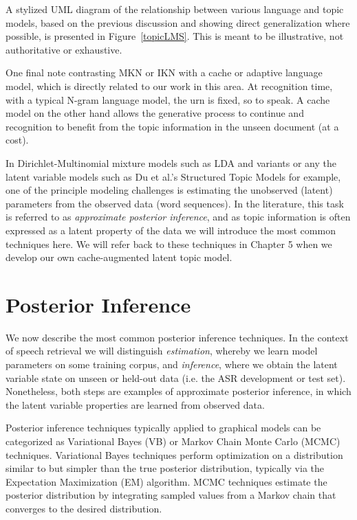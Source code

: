 % 

A stylized UML diagram of the relationship between various language and topic models, based on the previous discussion and showing direct generalization where possible, is presented in Figure~\ref{topicLMS}.  This is meant to be illustrative, not authoritative or exhaustive.

One final note contrasting MKN or IKN with a cache or adaptive language model, which is directly related to our work in this area.   At recognition time, with a typical N-gram language model, the urn is fixed, so to speak.  A cache model on the other hand allows the generative process to continue and recognition to benefit from the topic information in the unseen document (at a cost).  

In Dirichlet-Multinomial mixture models such as LDA and variants or any the latent variable models such as Du et al.'s Structured Topic Models for example, one of the principle modeling challenges is estimating the unobserved (latent) parameters from the observed data (word sequences).  In the literature, this task is referred to as \textit{approximate posterior inference}, and as topic information is often expressed as a latent property of the data we will introduce the most common techniques here.  We will refer back to these techniques in Chapter 5 when we develop our own cache-augmented latent topic model.

\section{Posterior Inference}
\label{sec:postInf}
We now describe the most common posterior inference techniques.  In the context of speech retrieval we will distinguish \textit{estimation}, whereby we learn model parameters on some training corpus, and \textit{inference}, where we obtain the latent variable state on unseen or held-out data (i.e. the ASR development or test set).  Nonetheless, both steps are examples of approximate posterior inference, in which the latent variable properties are learned from observed data.

Posterior inference techniques typically applied to graphical models can be categorized as Variational Bayes (VB) or Markov Chain Monte Carlo (MCMC) techniques.  Variational Bayes techniques perform optimization on a distribution similar to but simpler than the true posterior distribution, typically via the Expectation Maximization (EM) algorithm.  MCMC techniques estimate the posterior distribution by integrating sampled values from a Markov chain that converges to the desired distribution.

